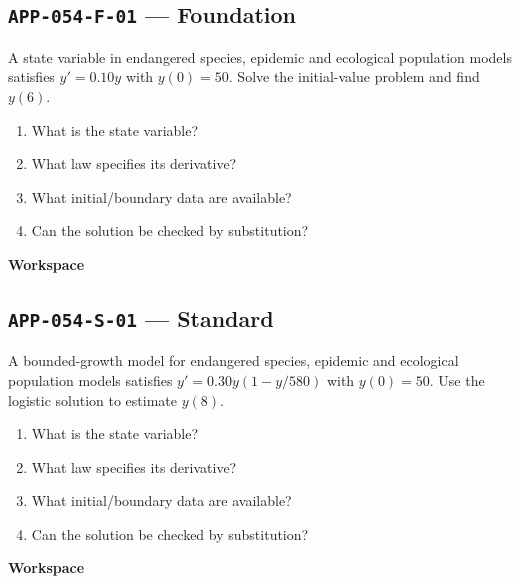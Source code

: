 \documentclass[11pt]{book}
\newcommand{\pid}[1]{\texttt{#1}}
\newcommand{\workspace}{\par\vspace{0.7in}\hrulefill\par\vspace{0.55in}\hrulefill\par}
\begin{document}
\subsection*{\pid{APP-054-F-01} — Foundation}
\begin{problembox}
A state variable in endangered species, epidemic and ecological population models satisfies $y'=0.10y$ with $y(0)=50$. Solve the initial-value problem and find $y(6)$.
\end{problembox}
\begin{promptbox}\begin{enumerate}
\item What is the state variable?
\item What law specifies its derivative?
\item What initial/boundary data are available?
\item Can the solution be checked by substitution?
\end{enumerate}\end{promptbox}
\textbf{Workspace}\workspace
{}
\subsection*{\pid{APP-054-S-01} — Standard}
\begin{problembox}
A bounded-growth model for endangered species, epidemic and ecological population models satisfies $y'=0.30y(1-y/580)$ with $y(0)=50$. Use the logistic solution to estimate $y(8)$.
\end{problembox}
\begin{promptbox}\begin{enumerate}
\item What is the state variable?
\item What law specifies its derivative?
\item What initial/boundary data are available?
\item Can the solution be checked by substitution?
\end{enumerate}\end{promptbox}
\textbf{Workspace}\workspace
{}
\end{document}

